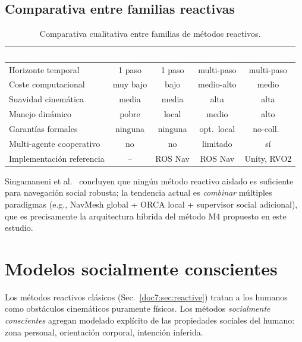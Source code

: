 \documentclass[12pt,a4paper,oneside]{book}
\begin{document}
\subsection{Comparativa entre familias reactivas}

\begin{table}[H]
\centering
\caption{Comparativa cualitativa entre familias de métodos reactivos.}
\renewcommand{\arraystretch}{1.3}
\small
\begin{tabular}{lcccc}
\toprule
\rowcolor{primary}
\textcolor{white}{\textbf{Aspecto}} &
\textcolor{white}{\textbf{APF}} &
\textcolor{white}{\textbf{DWA}} &
\textcolor{white}{\textbf{TEB}} &
\textcolor{white}{\textbf{ORCA}} \\
\midrule
Horizonte temporal       & 1 paso     & 1 paso       & multi-paso  & multi-paso \\
Coste computacional      & muy bajo   & bajo         & medio-alto  & medio \\
Suavidad cinemática      & media      & media        & alta        & alta \\
Manejo dinámico          & pobre      & local        & medio       & alto \\
Garantías formales       & ninguna    & ninguna      & opt.\ local & no-coll.\ \\
Multi-agente cooperativo & no         & no           & limitado    & sí \\
Implementación referencia& --         & ROS Nav      & ROS Nav     & Unity, RVO2 \\
\bottomrule
\end{tabular}
\end{table}

Singamaneni et al.~\cite{Singamaneni2024} concluyen que ningún método reactivo aislado es suficiente para navegación social robusta; la tendencia actual es \emph{combinar} múltiples paradigmas (e.g., NavMesh global + ORCA local + supervisor social adicional), que es precisamente la arquitectura híbrida del método M4 propuesto en este estudio.

\newpage
\section{Modelos socialmente conscientes}
\label{doc7:sec:social}

Los métodos reactivos clásicos (Sec.~\ref{doc7:sec:reactive}) tratan a los humanos como obstáculos cinemáticos puramente físicos. Los métodos \emph{socialmente conscientes} agregan modelado explícito de las propiedades sociales del humano: zona personal, orientación corporal, intención inferida.
\end{document}
